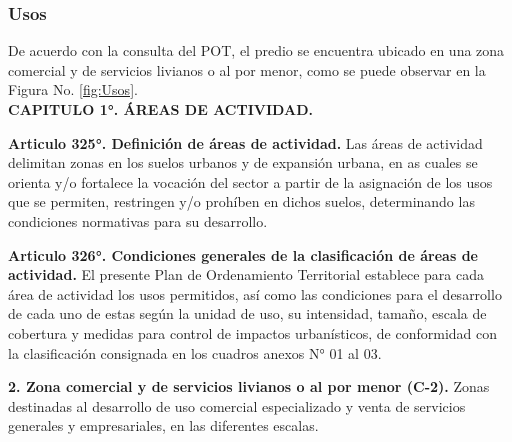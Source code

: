 \documentclass[12pt,a4paper,twoside]{article}
\begin{document}
\subsubsection{Usos}

De acuerdo con la consulta del POT, el predio se encuentra ubicado en una zona comercial y de servicios livianos o al por menor, como se puede observar en la Figura No. \ref{fig:Usos}.\\

\textbf{CAPITULO 1°. ÁREAS DE ACTIVIDAD.}

\textbf{Articulo 325°. Definición de áreas de actividad.} Las áreas de actividad delimitan zonas en los suelos urbanos y de expansión urbana, en as cuales se orienta y/o fortalece la vocación del sector a partir de la asignación de los usos que se permiten, restringen y/o prohíben en dichos suelos, determinando las condiciones normativas para su desarrollo.

\textbf{Articulo 326°. Condiciones generales de la clasificación de áreas de actividad.} El presente Plan de Ordenamiento Territorial establece para cada área de actividad los usos permitidos, así como las condiciones para el desarrollo de cada uno de estas según la unidad de uso, su intensidad, tamaño, escala de cobertura y medidas para control de impactos urbanísticos, de conformidad con la clasificación consignada en los cuadros anexos N° 01 al 03.

\textbf{2. Zona comercial y de servicios livianos o al por menor (C-2).} Zonas destinadas al desarrollo de uso comercial especializado y venta de servicios generales y empresariales, en las diferentes escalas.
\end{document}
